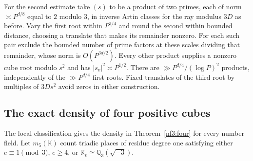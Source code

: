 \documentclass[11pt,letterpaper]{article}
\theoremstyle{definition}
\numberwithin{equation}{section}
\begin{document}
For the second estimate take $(s)$ to be a product of two primes,
each of norm $\asymp P^{d/8}$ equal to $2$ modulo $3$, in inverse
Artin classes for the ray modulus $3D$ as before. Vary the first
root within $P^{1/4}$ and round the second within bounded distance,
choosing a translate that makes its remainder nonzero. For each
such pair exclude the bounded number of prime factors at these
scales dividing that remainder, whose norm is $O(P^{3d/2})$.
Every other product supplies a nonzero cube root modulo $s^2$
and has $|s_v|^2\asymp P^{1/2}$. There are
$\gg P^{d/4}/(\log P)^2$ products, independently of the
$\gg P^{d/4}$ first roots. Fixed translates of the third root
by multiples of $3D s^2$ avoid zeros in either construction.

\subsection{The exact density of four positive cubes}
\label{sec:four-cube-exact-density}
The local classification gives the density in Theorem~\ref{nf3:four}
for every number field. Let $m_5(\mathbb K)$ count triadic places
of residue degree one satisfying either $e\equiv1\pmod3$, $e\ge4$,
or $\mathbb K_v\simeq\mathbb Q_3(\sqrt{-3})$.
\end{document}
